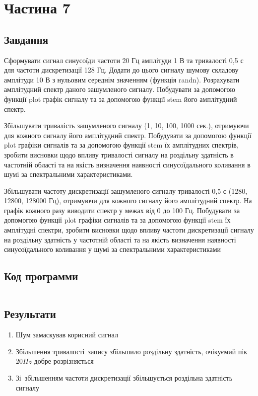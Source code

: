 \section{Частина 7}
\label{sec:task7}

\subsection{Завдання}
\label{subsec:task7_task}

Сформувати сигнал синусоїди частоти 20 Гц амплітуди 1 В та
тривалості 0,5 с для частоти дискретизації 128 Гц. Додати до цього сигналу
шумову складову амплітуди 10 В з нульовим середнім значенням (функція
randn). Розрахувати амплітудний спектр даного зашумленого сигналу.
Побудувати за допомогою функції plot графік сигналу та за допомогою функції
stem його амплітудний спектр.

Збільшувати тривалість зашумленого сигналу (1, 10, 100, 1000 сек.),
отримуючи для кожного сигналу його амплітудний спектр. Побудувати за
допомогою функції plot графіки сигналів та за допомогою функції stem їх
амплітудних спектрів, зробити висновки щодо впливу
тривалості сигналу на роздільну здатність в частотній області та на якість
визначення наявності синусоїдального коливання в шумі за спектральними
характеристиками.

Збільшувати частоту дискретизації зашумленого сигналу тривалості 0,5 с
(1280, 12800, 128000 Гц), отримуючи для кожного сигналу його амплітудний
спектр. На графік кожного разу виводити спектр у межах від 0 до 100 Гц.
Побудувати за допомогою функції plot графіки сигналів та за допомогою
функції stem їх амплітудні спектри, зробити висновки щодо
впливу частоти дискретизації сигналу на роздільну здатність у частотній
області та на якість визначення наявності синусоїдального коливання у шумі за
спектральними характеристиками

\subsection{Код программи}
\label{subsec:task7_code}
\inputminted{python}{../src/task7.py}

\subsection{Результати}
\label{subsec:task7_results}

\begin{enumerate}
    \item Шум замаскував корисний сигнал
    \item Збільшення тривалості запису збільшило роздільну здатність,
          очікуємий пік $20 Hz$ добре розрізняється
    \item Зі збільшенням частоти дискретизації збільшується роздільна здатність сигналу
\end{enumerate}

